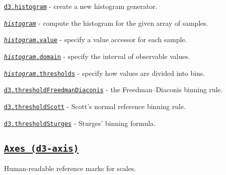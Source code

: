 \begin{DoxyItemize}
\item \href{https://github.com/d3/d3-array/blob/master/README.md#histogram}{\tt d3.\+histogram} -\/ create a new histogram generator.
\item \href{https://github.com/d3/d3-array/blob/master/README.md#_histogram}{\tt {\itshape histogram}} -\/ compute the histogram for the given array of samples.
\item \href{https://github.com/d3/d3-array/blob/master/README.md#histogram_value}{\tt {\itshape histogram}.value} -\/ specify a value accessor for each sample.
\item \href{https://github.com/d3/d3-array/blob/master/README.md#histogram_domain}{\tt {\itshape histogram}.domain} -\/ specify the interval of observable values.
\item \href{https://github.com/d3/d3-array/blob/master/README.md#histogram_thresholds}{\tt {\itshape histogram}.thresholds} -\/ specify how values are divided into bins.
\item \href{https://github.com/d3/d3-array/blob/master/README.md#thresholdFreedmanDiaconis}{\tt d3.\+threshold\+Freedman\+Diaconis} -\/ the Freedman–\+Diaconis binning rule.
\item \href{https://github.com/d3/d3-array/blob/master/README.md#thresholdScott}{\tt d3.\+threshold\+Scott} -\/ Scott’s normal reference binning rule.
\item \href{https://github.com/d3/d3-array/blob/master/README.md#thresholdSturges}{\tt d3.\+threshold\+Sturges} -\/ Sturges’ binning formula.
\end{DoxyItemize}

\subsection*{\href{https://github.com/d3/d3-axis}{\tt Axes (d3-\/axis)}}

Human-\/readable reference marks for scales.



